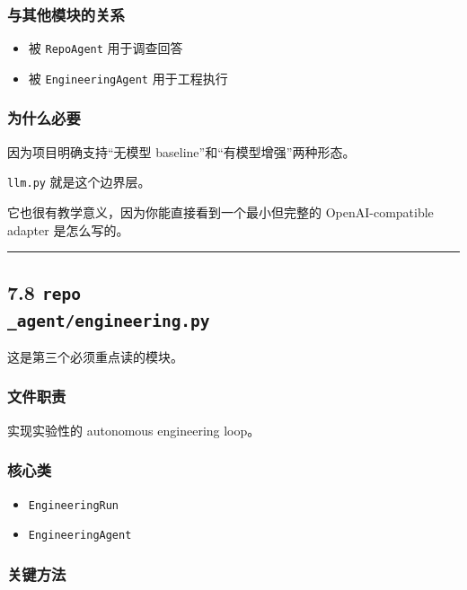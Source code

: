 \documentclass[UTF8,12pt,openany]{ctexbook}
\begin{document}
\subsubsection{与其他模块的关系}

\begin{itemize}
\item 被 \texttt{RepoAgent} 用于调查回答
\item 被 \texttt{EngineeringAgent} 用于工程执行
\end{itemize}

\subsubsection{为什么必要}

因为项目明确支持“无模型 baseline”和“有模型增强”两种形态。  \par
\texttt{llm.py} 就是这个边界层。\par

它也很有教学意义，因为你能直接看到一个最小但完整的 OpenAI-compatible adapter 是怎么写的。\par

\hrule

\subsection{7.8 \texttt{repo\\_agent/engineering.py}}

这是第三个必须重点读的模块。\par

\subsubsection{文件职责}

实现实验性的 autonomous engineering loop。\par

\subsubsection{核心类}

\begin{itemize}
\item \texttt{EngineeringRun}
\item \texttt{EngineeringAgent}
\end{itemize}

\subsubsection{关键方法}
\end{document}
